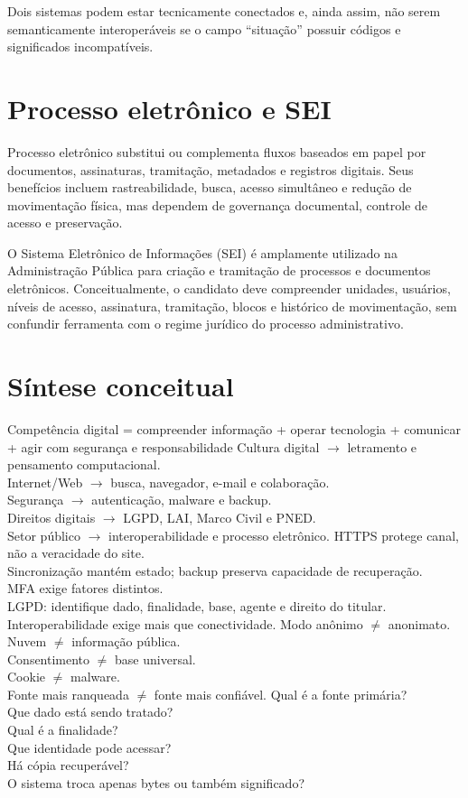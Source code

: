 Dois sistemas podem estar tecnicamente conectados e, ainda assim, não serem semanticamente interoperáveis se o campo ``situação'' possuir códigos e significados incompatíveis.

\section{Processo eletrônico e SEI}

Processo eletrônico substitui ou complementa fluxos baseados em papel por documentos, assinaturas, tramitação, metadados e registros digitais. Seus benefícios incluem rastreabilidade, busca, acesso simultâneo e redução de movimentação física, mas dependem de governança documental, controle de acesso e preservação.

O Sistema Eletrônico de Informações (SEI) é amplamente utilizado na Administração Pública para criação e tramitação de processos e documentos eletrônicos. Conceitualmente, o candidato deve compreender unidades, usuários, níveis de acesso, assinatura, tramitação, blocos e histórico de movimentação, sem confundir ferramenta com o regime jurídico do processo administrativo.

\section{Síntese conceitual}

{Competência digital = compreender informação + operar tecnologia + comunicar + agir com segurança e responsabilidade}
{Cultura digital $\rightarrow$ letramento e pensamento computacional.\\Internet/Web $\rightarrow$ busca, navegador, e-mail e colaboração.\\Segurança $\rightarrow$ autenticação, malware e backup.\\Direitos digitais $\rightarrow$ LGPD, LAI, Marco Civil e PNED.\\Setor público $\rightarrow$ interoperabilidade e processo eletrônico.}
{HTTPS protege canal, não a veracidade do site.\\Sincronização mantém estado; backup preserva capacidade de recuperação.\\MFA exige fatores distintos.\\LGPD: identifique dado, finalidade, base, agente e direito do titular.\\Interoperabilidade exige mais que conectividade.}
{Modo anônimo $\neq$ anonimato.\\Nuvem $\neq$ informação pública.\\Consentimento $\neq$ base universal.\\Cookie $\neq$ malware.\\Fonte mais ranqueada $\neq$ fonte mais confiável.}
{Qual é a fonte primária?\\Que dado está sendo tratado?\\Qual é a finalidade?\\Que identidade pode acessar?\\Há cópia recuperável?\\O sistema troca apenas bytes ou também significado?}

